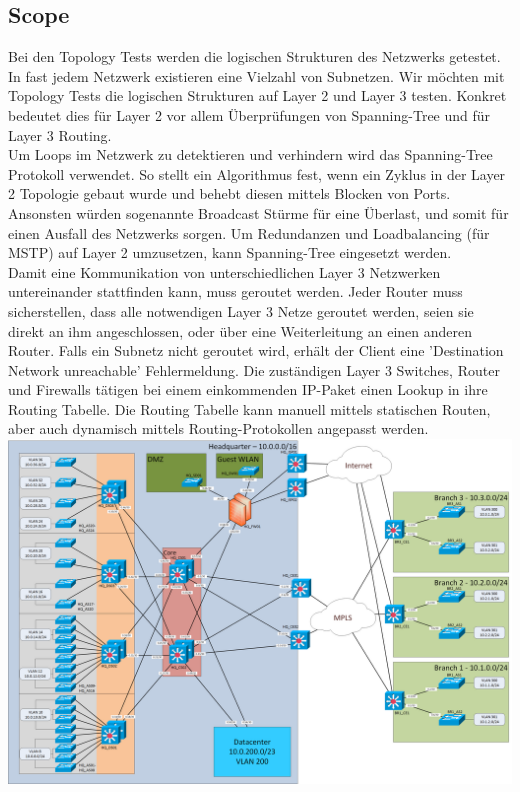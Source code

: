 \documentclass[a4,12pt]{scrartcl}
\begin{document}
\subsection{Scope}
Bei den Topology Tests werden die logischen Strukturen des Netzwerks getestet. In fast jedem Netzwerk existieren eine Vielzahl von Subnetzen. Wir möchten mit Topology Tests die logischen Strukturen auf Layer 2 und Layer 3 testen. Konkret bedeutet dies für Layer 2 vor allem Überprüfungen von Spanning-Tree und für Layer 3 Routing.\\

\noindent Um Loops im Netzwerk zu detektieren und verhindern wird das Spanning-Tree Protokoll verwendet. So stellt ein Algorithmus fest, wenn ein Zyklus in der Layer 2 Topologie gebaut wurde und behebt diesen mittels Blocken von Ports. Ansonsten würden sogenannte Broadcast Stürme für eine Überlast, und somit für einen Ausfall des Netzwerks sorgen. Um Redundanzen und Loadbalancing (für MSTP) auf Layer 2 umzusetzen, kann Spanning-Tree eingesetzt werden.\\

\noindent Damit eine Kommunikation von unterschiedlichen Layer 3 Netzwerken untereinander stattfinden kann, muss geroutet werden. Jeder Router muss sicherstellen, dass alle notwendigen Layer 3 Netze geroutet werden, seien sie direkt an ihm angeschlossen, oder über eine Weiterleitung an einen anderen Router. Falls ein Subnetz nicht geroutet wird, erhält der Client eine 'Destination Network unreachable' Fehlermeldung. Die zuständigen Layer 3 Switches, Router und Firewalls tätigen bei einem einkommenden IP-Paket einen Lookup in ihre Routing Tabelle. Die Routing Tabelle kann manuell mittels statischen Routen, aber auch dynamisch mittels Routing-Protokollen angepasst werden.\\

\includegraphics[width=1\textwidth]{figures/Netzwerk_logisch.png}\\
\end{document}
